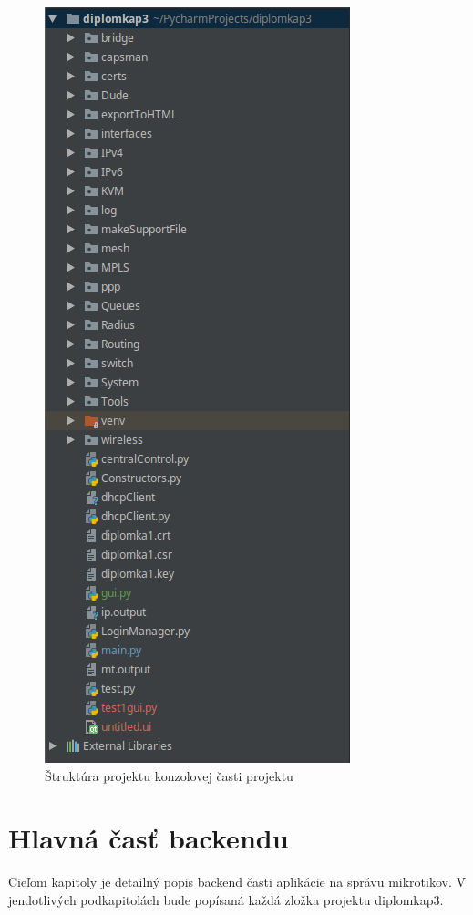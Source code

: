 \begin{figure}[H]
\centering
\includegraphics[scale=0.4]{../text/struktura.png}
\caption{Štruktúra projektu konzolovej časti projektu}
\label{fig:structure}
\end{figure} 
\chapter{Hlavná časť backendu}
Cieľom kapitoly je detailný popis backend časti aplikácie na správu mikrotikov. V jendotlivých podkapitolách bude popísaná každá zložka projektu diplomkap3.
